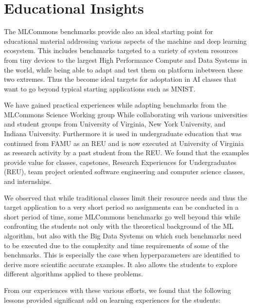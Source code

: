 \documentclass[utf8]{FrontiersinVancouver} %
\begin{document}
\section{Educational Insights}

The MLCommons benchmarks provide also an ideal starting point for
educational material addressing various aspects of the machine and
deep learning ecosystem. This includes benchmarks targeted to a
variety of system resources from tiny devices to the largest High
Performance Compute and Data Systems in the world, while being able to
adapt and test them on platform inbetween these two extremes. Thus
the become ideal targets for adoptation in AI classes that want to go
beyond typical starting applications such as MNIST.

We have gained practical experiences while adapting benchmarks from
the MLCommons Science Working group While collaborating wih various
universities and student groups from University of Virginia, New York
University, and Indiana University. Furthermore it is used in
undergraduate education that was continued from FAMU as an REU and is
now executed at University of Virginia as research activity by a past
student from the REU. We found that the examples provide value for
classes, capstones, Research Experiences for Undergraduates (REU),
team project oriented software engineering and computer science
classes, and internships.

We observed that while traditional classes limit their resource needs
and thus the target application to a very short period so assignments
can be conducted in a short period of time, some MLCommons benchmarks
go well beyond this while confronting the students not only with the
theoretical background of the ML algorithm, but also with the Big Data
Systems on which such benchmarks need to be executed due to the
complexity and time requirements of some of the benchmarks. This is
especially the case when hyperparameters are identified to derive more
scientific accurate examples. It also allows the students to explore
different algorithms applied to these problems.

From our experiences with these various efforts, we found that the
following lessons provided significant add on learning experiences for
the students:
\end{document}
